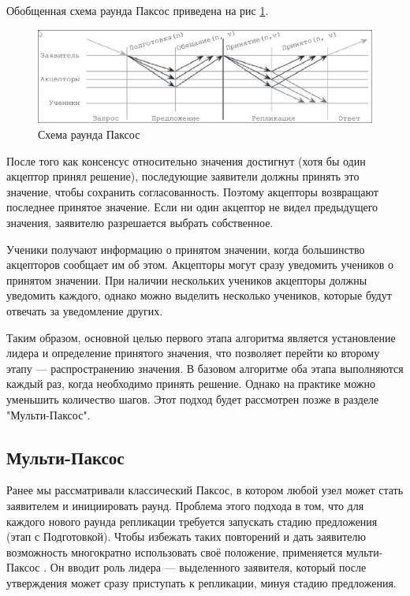 Обобщенная схема раунда Паксос приведена на рис \ref{fig:paxos}.

\begin{figure}
  \centering
  \includegraphics[scale=0.4]{inc/paxos.png}
  \caption{Схема раунда Паксос}
  \label{fig:paxos}
\end{figure}

После того как консенсус относительно значения достигнут (хотя бы один акцептор
принял решение), последующие заявители должны принять это значение, чтобы
сохранить согласованность. Поэтому акцепторы возвращают последнее принятое
значение. Если ни один акцептор не видел предыдущего значения, заявителю
разрешается выбрать собственное.

Ученики получают информацию о принятом значении, когда большинство акцепторов
сообщает им об этом. Акцепторы могут сразу уведомить учеников о принятом
значении. При наличии нескольких учеников акцепторы должны уведомить каждого,
однако можно выделить несколько учеников, которые будут отвечать за
уведомление других.

Таким образом, основной целью первого этапа алгоритма является установление
лидера и определение принятого значения, что позволяет перейти ко второму
этапу — распространению значения. В базовом алгоритме оба этапа выполняются
каждый раз, когда необходимо принять решение. Однако на практике можно
уменьшить количество шагов. Этот подход будет рассмотрен позже в разделе
"Мульти-Паксос".

\subsection{Мульти-Паксос}

Ранее мы рассматривали классический Паксос, в котором любой узел может стать
заявителем и инициировать раунд. Проблема этого подхода в том, что для каждого
нового раунда репликации требуется запускать стадию предложения (этап с
Подготовкой). Чтобы избежать таких повторений и дать заявителю возможность
многократно использовать своё положение, применяется мульти-Паксос \cite{lamport01}.
Он вводит роль лидера — выделенного заявителя, который после утверждения может
сразу приступать к репликации, минуя стадию предложения.


